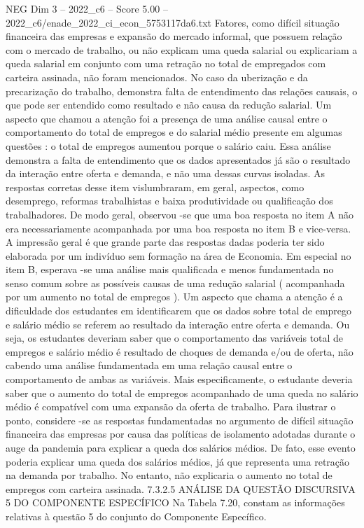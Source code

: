 \begin{textsample}{NEG Dim 3 – 2022\_c6 – Score 5.00 – 2022\_c6/enade\_2022\_ci\_econ\_5753117da6.txt}
Fatores, como difícil situação financeira das empresas e expansão do mercado informal, que possuem relação com o mercado de trabalho, ou não explicam uma queda salarial ou explicariam a queda salarial em conjunto com uma retração no total de empregados com carteira assinada, não foram mencionados.
No caso da uberização e da precarização do trabalho, demonstra falta de entendimento das relações causais, o que pode ser entendido como resultado e não causa da redução salarial.
Um aspecto que chamou a atenção foi a presença de uma análise causal entre o comportamento do total de empregos e do salarial médio presente em algumas questões : o total de empregos aumentou porque o salário caiu.
Essa análise demonstra a falta de entendimento que os dados apresentados já são o resultado da interação entre oferta e demanda, e não uma dessas curvas isoladas.
As respostas corretas desse item vislumbraram, em geral, aspectos, como desemprego, reformas trabalhistas e baixa produtividade ou qualificação dos trabalhadores.
De modo geral, observou -se que uma boa resposta no item A não era necessariamente acompanhada por uma boa resposta no item B e vice-versa.
A impressão geral é que grande parte das respostas dadas poderia ter sido elaborada por um indivíduo sem formação na área de Economia.
Em especial no item B, esperava -se uma análise mais qualificada e menos fundamentada no senso comum sobre as possíveis causas de uma redução salarial ( acompanhada por um aumento no total de empregos ).
Um aspecto que chama a atenção é a dificuldade dos estudantes em identificarem que os dados sobre total de emprego e salário médio se referem ao resultado da interação entre oferta e demanda.
Ou seja, os estudantes deveriam saber que o comportamento das variáveis total de empregos e salário médio é resultado de choques de demanda e/ou de oferta, não cabendo uma análise fundamentada em uma relação causal entre o comportamento de ambas as variáveis.
Mais especificamente, o estudante deveria saber que o aumento do total de empregos acompanhado de uma queda no salário médio é compatível com uma expansão da oferta de trabalho.
Para ilustrar o ponto, considere -se as respostas fundamentadas no argumento de difícil situação financeira das empresas por causa das políticas de isolamento adotadas durante o auge da pandemia para explicar a queda dos salários médios.
De fato, esse evento poderia explicar uma queda dos salários médios, já que representa uma retração na demanda por trabalho.
No entanto, não explicaria o aumento no total de empregos com carteira assinada. 7.3.2.5 ANÁLISE DA QUESTÃO DISCURSIVA 5 DO COMPONENTE ESPECÍFICO Na Tabela 7.20, constam as informações relativas à questão 5 do conjunto do Componente Específico.

\end{textsample}
